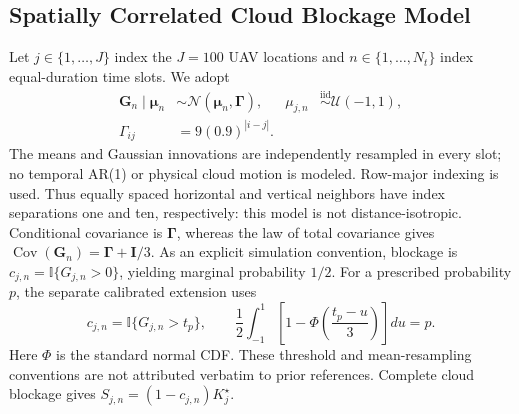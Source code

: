 \subsection{Spatially Correlated Cloud Blockage Model}
Let $j\in\{1,\ldots,J\}$ index the $J=100$ UAV locations and
$n\in\{1,\ldots,N_t\}$ index equal-duration time slots. We adopt
\begin{align}
 \boldsymbol G_n\mid\boldsymbol\mu_n&\sim\mathcal N(\boldsymbol\mu_n,\boldsymbol\Gamma),
 &\mu_{j,n}&\overset{\mathrm{iid}}\sim\mathcal U(-1,1),\label{eq:phaseD_cloud}\\
 \Gamma_{ij}&=9(0.9)^{|i-j|}.\label{eq:phaseD_gamma}
\end{align}
The means and Gaussian innovations are independently resampled in every
slot; no temporal AR(1) or physical cloud motion is modeled. Row-major
indexing is used. Thus equally spaced horizontal and vertical neighbors
have index separations one and ten, respectively: this model is not
distance-isotropic. Conditional covariance is $\boldsymbol\Gamma$, whereas
the law of total covariance gives
$\operatorname{Cov}(\boldsymbol G_n)=\boldsymbol\Gamma+\boldsymbol I/3$.
As an explicit simulation convention, blockage is
$c_{j,n}=\mathbb I\{G_{j,n}>0\}$, yielding marginal probability $1/2$.
For a prescribed probability $p$, the separate calibrated extension uses
\begin{equation}
 c_{j,n}=\mathbb I\{G_{j,n}>t_p\},\qquad
 \frac12\int_{-1}^{1}\left[1-\Phi\!\left(\frac{t_p-u}{3}\right)\right]du=p.
 \label{eq:phaseD_threshold}
\end{equation}
Here $\Phi$ is the standard normal CDF. These threshold and mean-resampling
conventions are not attributed verbatim to prior references. Complete cloud
blockage gives $S_{j,n}=(1-c_{j,n})K_j^\star$.
